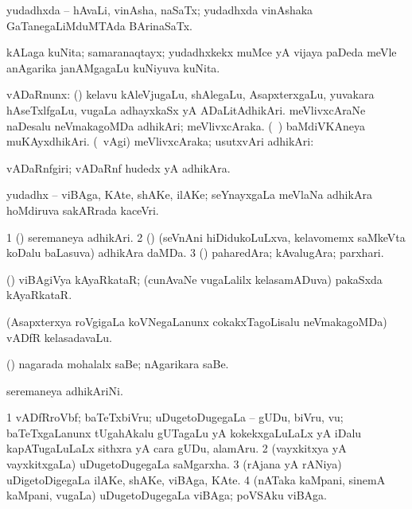\bentry 
{} 
\gl{\nA}
\expl{}
\bmng
yudadhxda -- hAvaLi, vinAsha, naSaTx; yudadhxda vinAshaka GaTanegaLiMduMTAda BArinaSaTx. 
\emng
\eentry

\bentry
{} 
\gl{\nA}
\expl{}
\bmng
kALaga kuNita; samaranaqtayx; yudadhxkekx muMce yA vijaya paDeda meVle anAgarika janAMgagaLu kuNiyuva kuNita. 
\emng
\eentry

\bentry
{} 
\gl{\nA}
\expl{}
\bmng
vADaRnunx: 
\banum
{} (\birx) kelavu kAleVjugaLu, shAlegaLu, AsapxterxgaLu, yuvakara hAseTxlfgaLu, \mo vugaLa adhayxkaSx yA ADaLitAdhikAri. 
 meVlivxcAraNe naDesalu neVmakagoMDa adhikAri; meVlivxcAraka. 
 (\kanmu\ \ame) baMdiVKAneya muKAyxdhikAri. 
 (\sA\ \saupa vAgi) meVlivxcAraka; usutxvAri adhikAri:  
\eanum
\emng
\eentry

\bentry
{} 
\gl{\nA}
\expl{}
\bmng
vADaRnfgiri; vADaRnf hudedx yA adhikAra. 
\emng
\eentry

\bentry
{} 
\gl{\nA}
\expl{}
\bmng
yudadhx -- viBAga, KAte, shAKe, ilAKe; seYnayxgaLa meVlaNa adhikAra hoMdiruva sakARrada kaceVri. 
\emng
\eentry

\bentry
{} 
\gl{\nA}
\expl{}
\bmng
\bnum
\num{1} (\birx) seremaneya adhikAri. 
\num{2} (\ca) (seVnAni hiDidukoLuLxva, kelavomemx saMkeVta koDalu baLasuva) adhikAra daMDa. 
\num{3} (\pArxparx) paharedAra; kAvalugAra; parxhari. 
\enum
\emng
\eentry

\bentry
{} 
\gl{\nA}
\expl{}
\bmng
(\ame) viBAgiVya kAyaRkataR; (cunAvaNe \mo vugaLalilx kelasamADuva) pakaSxda kAyaRkataR. 
\emng
\eentry

\bentry
{} 
\gl{\nA}
\expl{}
\bmng
(Asapxterxya roVgigaLa koVNegaLanunx cokakxTagoLisalu neVmakagoMDa) vADfR kelasadavaLu. 
\emng
\eentry

\bentry
{} 
\gl{\nA}
\expl{}
\bmng
(\birx) nagarada mohalalx saBe; nAgarikara saBe. 
\emng
\eentry

\bentry
{} 
\gl{\nA}
\expl{}
\bmng
seremaneya adhikAriNi. 
\emng
\eentry

\bentry
{} 
\gl{\nA}
\expl{}
\bmng
\bnum
\num{1} vADfRroVbf; baTeTxbiVru; uDugetoDugegaLa -- gUDu, biVru, \mo vu; baTeTxgaLanunx tUgahAkalu gUTagaLu yA kokekxgaLuLaLx yA iDalu kapATugaLuLaLx sithxra yA cara gUDu, alamAru. 
\num{2} (vayxkitxya yA vayxkitxgaLa) uDugetoDugegaLa saMgarxha. 
\num{3} (rAjana yA rANiya) uDigetoDigegaLa ilAKe, shAKe, viBAga, KAte. 
\num{4} (nATaka kaMpani, sinemA kaMpani, \mo vugaLa) uDugetoDugegaLa viBAga; poVSAku viBAga. 
\enum
\emng
\eentry

